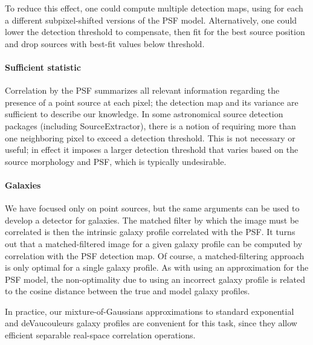 \documentclass[11pt,letterpaper,linenumbers]{aastex63}
\begin{document}
To reduce this effect, one could compute multiple detection maps,
using for each a different subpixel-shifted versions of the PSF model.
Alternatively, one could lower the detection threshold to compensate,
then fit for the best source position and drop sources with best-fit
values below threshold.


\paragraph{Sufficient statistic}  Correlation by the PSF summarizes
all relevant information regarding the presence of a point source at each
pixel; the detection map and its variance are sufficient to describe
our knowledge.  In some astronomical source detection packages
(including SourceExtractor), there is a notion of requiring more than
one neighboring pixel to exceed a detection threshold.  This is not
necessary or useful; in effect it imposes a larger detection threshold
that varies based on the source morphology and PSF, which is
typically undesirable.



\paragraph{Galaxies}
We have focused only on point sources, but the same arguments can be
used to develop a detector for galaxies.  The matched filter by which
the image must be correlated is then the intrinsic galaxy profile
correlated with the PSF.  It turns out \citep{zackay1} that a
matched-filtered image for a given galaxy profile can be computed by
correlation with the PSF detection map.
Of course, a matched-filtering approach is only optimal
for a single galaxy profile.  As with using an approximation for the
PSF model, the non-optimality due to using an incorrect galaxy profile
is related to the cosine distance between the true and model galaxy
profiles.

In practice, our mixture-of-Gaussians approximations to standard
exponential and deVaucouleurs galaxy profiles \citep{gaussgals} are
convenient for this task, since they allow efficient separable
real-space correlation operations.
\end{document}
